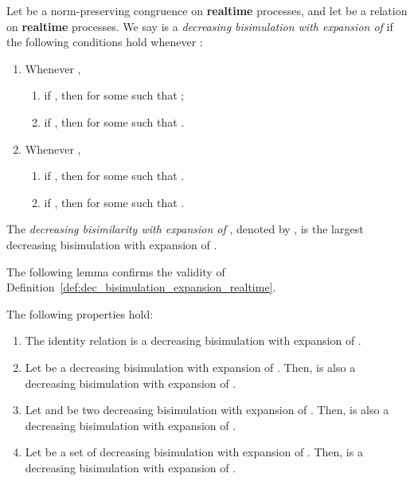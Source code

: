 \documentclass{llncs}
\begin{document}
\begin{definition}\label{def:dec_bisimulation_expansion_realtime}
Let  be a norm-preserving congruence on \textbf{realtime} processes, and
let  be a relation on \textbf{realtime} processes.  We say  is a {\em decreasing bisimulation with expansion of}   if the following conditions hold whenever :
\begin{enumerate}
\item
Whenever ,
\begin{enumerate}
\item
if  ,
then
 for some  such that ;

\item
if  ,
then
 for some  such that .
\end{enumerate}

\item
Whenever ,
\begin{enumerate}
\item
if ,
then
 for some  such that .

\item
if ,
then
 for some  such that .
\end{enumerate}
\end{enumerate}

The {\em decreasing bisimilarity with expansion of }, denoted by  , is the largest decreasing bisimulation with expansion of .
\end{definition}

The following lemma confirms the validity of Definition~\ref{def:dec_bisimulation_expansion_realtime}.

\begin{lemma}\label{lem:property_decreasing_bisimulation_expansion_realtime}
The following properties hold:
\begin{enumerate}
\item
The identity relation is a decreasing bisimulation with expansion of .

\item
Let  be a decreasing bisimulation with expansion of . Then,  is also a decreasing  bisimulation with expansion of .

\item
Let  and  be two decreasing  bisimulation with expansion of . Then,   is also a decreasing  bisimulation with expansion of .

\item
Let  be a set of  decreasing  bisimulation with expansion of . Then,  is a decreasing  bisimulation with expansion of .
\end{enumerate}
\end{lemma}
\end{document}
